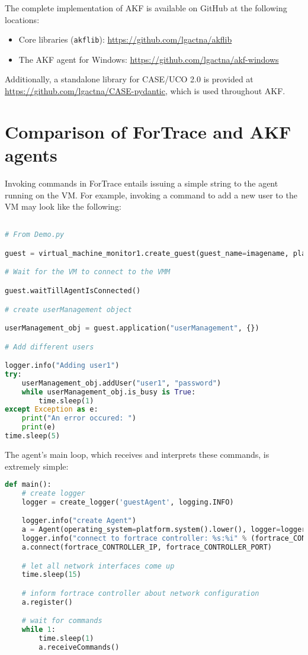 \documentclass[letterpaper,12pt]{report}
\def\tightlist{}
\newcommand{\passthrough}[1]{#1}
\begin{document}
The complete implementation of AKF is available on GitHub at the
following locations:

\begin{itemize}
\tightlist
\item
  Core libraries (\passthrough{\lstinline!akflib!}):
  \url{https://github.com/lgactna/akflib}
\item
  The AKF agent for Windows:
  \url{https://github.com/lgactna/akf-windows}
\end{itemize}

Additionally, a standalone library for CASE/UCO 2.0 is provided at
\url{https://github.com/lgactna/CASE-pydantic,} which is used throughout
AKF.

\section{Comparison of ForTrace and AKF
agents}\label{comparison-of-fortrace-and-akf-agents}

Invoking commands in ForTrace entails issuing a simple string to the
agent running on the VM. For example, invoking a command to add a new
user to the VM may look like the following:

\begin{lstlisting}[language=Python]

# From Demo.py

guest = virtual_machine_monitor1.create_guest(guest_name=imagename, platform="windows")

# Wait for the VM to connect to the VMM

guest.waitTillAgentIsConnected()

# create userManagement object

userManagement_obj = guest.application("userManagement", {})

# Add different users

logger.info("Adding user1")
try:
    userManagement_obj.addUser("user1", "password")
    while userManagement_obj.is_busy is True:
        time.sleep(1)
except Exception as e:
    print("An error occured: ")
    print(e)
time.sleep(5)
\end{lstlisting}

The agent's main loop, which receives and interprets these commands, is
extremely simple:

\begin{lstlisting}[language=Python]
def main():
    # create logger
    logger = create_logger('guestAgent', logging.INFO)

    logger.info("create Agent")
    a = Agent(operating_system=platform.system().lower(), logger=logger)
    logger.info("connect to fortrace controller: %s:%i" % (fortrace_CONTROLLER_IP, fortrace_CONTROLLER_PORT))
    a.connect(fortrace_CONTROLLER_IP, fortrace_CONTROLLER_PORT)

    # let all network interfaces come up
    time.sleep(15)

    # inform fortrace controller about network configuration
    a.register()

    # wait for commands
    while 1:
        time.sleep(1)
        a.receiveCommands()
\end{lstlisting}
\end{document}
